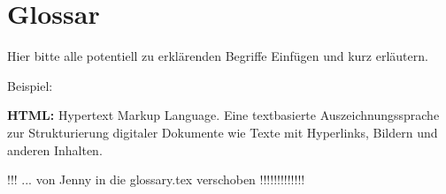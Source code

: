 \chapter{Glossar}

Hier bitte alle potentiell zu erklärenden Begriffe Einfügen und kurz erläutern. 

Beispiel: 

\textbf{HTML:} Hypertext Markup Language. Eine textbasierte Auszeichnungssprache zur Strukturierung digitaler Dokumente wie Texte mit Hyperlinks, Bildern und anderen Inhalten.

!!! ... von Jenny in die glossary.tex verschoben !!!!!!!!!!!!!